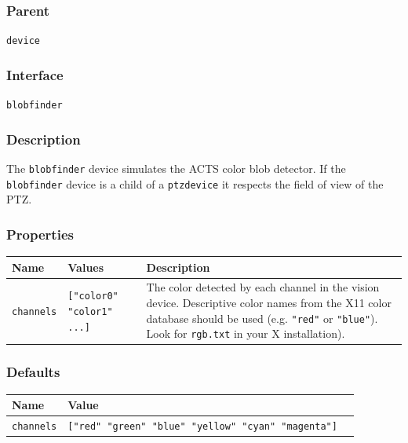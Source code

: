 \documentclass[11pt,twoside]{report}
\begin{document}
\subsubsection*{Parent}
{\tt device}

\subsubsection*{Interface}
{\tt blobfinder}

\subsubsection*{Description}
The \verb'blobfinder' device simulates the ACTS color blob
detector. If the \verb'blobfinder' device is a child of a
\verb'ptzdevice' it respects the field of view of the PTZ.

\subsubsection*{Properties}
\begin{tabularx}{\columnwidth}{llX}
\hline
Name & Values & Description \\
\hline
\verb'channels' & \verb'["color0" "color1" ...]' & The
color detected by each channel in the vision device.  Descriptive
color names from the X11 color database should be used
(e.g. \verb'"red"' or \verb'"blue"').  Look for \verb'rgb.txt' in your
X installation).\\
\hline
\end{tabularx}

\subsubsection*{Defaults}
\begin{tabularx}{\columnwidth}{llX}
\hline
Name & Value\\
\hline
\verb'channels' & \verb'["red" "green" "blue" "yellow" "cyan" "magenta"]'\\
\hline
\end{tabularx}



\end{document}
